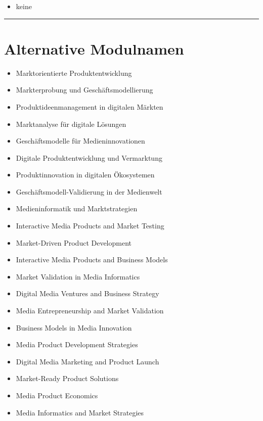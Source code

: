 \begin{itemize}
\tightlist
\item
  keine
\end{itemize}

\begin{center}\rule{0.5\linewidth}{0.5pt}\end{center}

\hypertarget{alternative-modulnamenpathlabel....srcmodulbeschreibungen-bachelor-bpo5ba_product-dimensions}{%
\section*{Alternative
Modulnamen\label{../../src/modulbeschreibungen-bachelor-bpo5/BA_Product-Dimensions}}\label{alternative-modulnamenpathlabel....srcmodulbeschreibungen-bachelor-bpo5ba_product-dimensions}}

\begin{itemize}
\tightlist
\item
  Marktorientierte Produktentwicklung
\item
  Markterprobung und Geschäftsmodellierung
\item
  Produktideenmanagement in digitalen Märkten
\item
  Marktanalyse für digitale Lösungen
\item
  Geschäftsmodelle für Medieninnovationen
\item
  Digitale Produktentwicklung und Vermarktung
\item
  Produktinnovation in digitalen Ökosystemen
\item
  Geschäftsmodell-Validierung in der Medienwelt
\item
  Medieninformatik und Marktstrategien
\item
  Interactive Media Products and Market Testing
\item
  Market-Driven Product Development
\item
  Interactive Media Products and Business Models
\item
  Market Validation in Media Informatics
\item
  Digital Media Ventures and Business Strategy
\item
  Media Entrepreneurship and Market Validation
\item
  Business Models in Media Innovation
\item
  Media Product Development Strategies
\item
  Digital Media Marketing and Product Launch
\item
  Market-Ready Product Solutions
\item
  Media Product Economics
\item
  Media Informatics and Market Strategies
\end{itemize}

